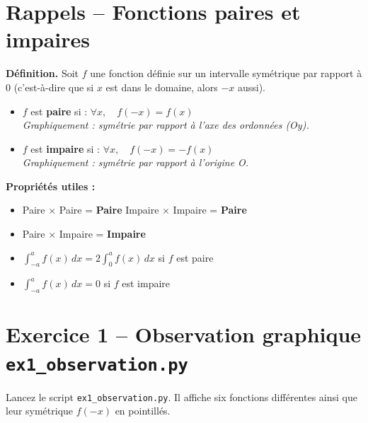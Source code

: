 \documentclass[12pt,a4paper]{article}
\begin{document}
\section{Rappels -- Fonctions paires et impaires}

\begin{definitionbox}
\textbf{Définition.} Soit $f$ une fonction définie sur un intervalle symétrique par rapport à $0$ (c'est-à-dire que si $x$ est dans le domaine, alors $-x$ aussi).

\begin{itemize}
    \item $f$ est \textbf{paire} si : $\forall x,\quad f(-x) = f(x)$\\
    \textit{Graphiquement : symétrie par rapport à l'axe des ordonnées (Oy).}

    \item $f$ est \textbf{impaire} si : $\forall x,\quad f(-x) = -f(x)$\\
    \textit{Graphiquement : symétrie par rapport à l'origine O.}
\end{itemize}
\end{definitionbox}

\medskip

\begin{rappelbox}
\textbf{Propriétés utiles :}
\begin{itemize}
    \item Paire $\times$ Paire = \textbf{Paire} \hfill Impaire $\times$ Impaire = \textbf{Paire}
    \item Paire $\times$ Impaire = \textbf{Impaire}
    \item $\displaystyle\int_{-a}^{a} f(x)\,dx = 2\int_{0}^{a} f(x)\,dx$ si $f$ est paire
    \item $\displaystyle\int_{-a}^{a} f(x)\,dx = 0$ si $f$ est impaire
\end{itemize}
\end{rappelbox}

\newpage


\section{Exercice 1 -- Observation graphique \hfill\normalsize\texttt{ex1\_observation.py}}

\begin{fichierbox}
Lancez le script \texttt{ex1\_observation.py}. Il affiche six fonctions différentes ainsi que leur symétrique $f(-x)$ en pointillés.
\end{fichierbox}
\end{document}
